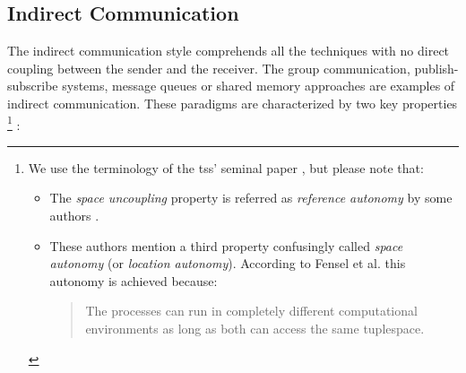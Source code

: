




\subsection{Indirect Communication}
\label{sec:indirect_communication}

The indirect communication style comprehends all the techniques with no direct coupling between the sender and the receiver.
The group communication, publish-subscribe systems, message queues or shared memory approaches are examples of indirect communication.
These paradigms are characterized by two key properties \cite{gelernter_generative_1985,coulouris_distributed_2012}
\footnote{
  We use the terminology of the  \aclp{ts}' seminal paper \cite{gelernter_generative_1985}, but please note that:
  \begin{itemize}
    \item The \emph{space uncoupling} property is referred as \emph{reference autonomy} by some authors \cite{fensel_triple-space_2004}.
    \item These authors mention a third property confusingly called \emph{space autonomy} (or \emph{location autonomy}).
	  According to Fensel et al.\cite{fensel_triple-space_2004} this autonomy is achieved because:
	  \begin{quote}
	    The processes can run in completely different computational environments as long as both can access the same tuplespace.
	  \end{quote}
  \end{itemize}
}
:

